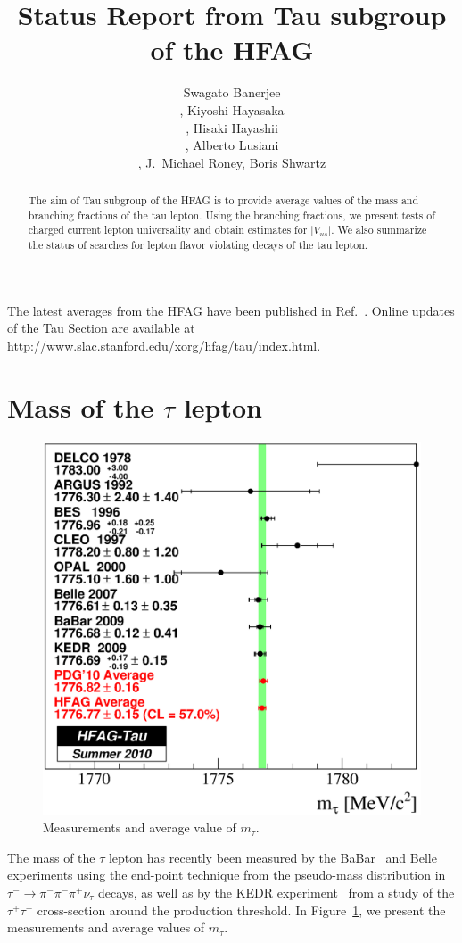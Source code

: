 \documentclass[fleqn,twoside]{article}
\title{Status Report from Tau subgroup of the HFAG}
\author{Swagato Banerjee\address[UVIC]{University of Victoria, Canada.},
        Kiyoshi Hayasaka\address{Nagoya University, Japan.},
        Hisaki Hayashii\address{Nara Womana's University, Japan.},
        Alberto Lusiani\address{INFN Pisa, Italy.},
        J.~Michael Roney\addressmark[UVIC],
        Boris Shwartz\address{Budker Institute of Nuclear Physics, Russia.}}
\begin{document}
\begin{abstract}
The aim of Tau subgroup of the HFAG is to provide average values
of the mass and branching fractions of the tau lepton.
Using the branching fractions, we present tests of charged current
lepton universality and obtain estimates for $|V_{us}|$.
We also summarize the status of searches for lepton flavor violating
decays of the tau lepton.
\vspace{1pc}
\end{abstract}

\maketitle

The latest averages from the HFAG have been published in Ref.~\cite{HFAG:2010qj}.
Online updates of the Tau Section are available at \url{http://www.slac.stanford.edu/xorg/hfag/tau/index.html}.

\section{Mass of the $\tau$ lepton}
\label{sec:Tau_Mass}

\begin{figure}[!hbtp]
\begin{center}
\includegraphics[height=.42\textheight,width=.49\textwidth]{figures/TauMass.eps}
\end{center}
\caption{Measurements and average value of $m_\tau$.}
\label{fig:Tau_Mass}
\end{figure}

The mass of the $\tau$ lepton has recently been measured by the BaBar~\cite{Aubert:2009ra} and Belle~\cite{Abe:2006vf} experiments
using the end-point technique from the pseudo-mass distribution in $\tau^-\to\pi^-\pi^-\pi^+\nu_\tau$ decays,
as well as by the KEDR experiment~\cite{Shamov:2009zz} from a study of the $\tau^+\tau^-$ cross-section around the production threshold.
In Figure~\ref{fig:Tau_Mass}, we present the measurements and average values of $m_\tau$.
\end{document}
